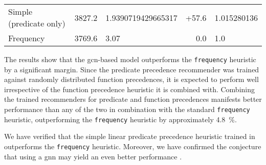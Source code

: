 \begin{table*}[h]
\begin{tabular}{l|ll|rl}
Simple (predicate only) &
\num{3827.2} &
\num[round-mode=places,round-precision=2]{1.9390719429665317} &
+57.6 &
\num[round-mode=places,round-precision=3]{1.015280136} \\




Frequency &
\num{3769.6} &
\num{3.07} &
0.0 &
\num[round-mode=places,round-precision=3]{1.0} \\

\end{tabular}
\end{table*}

The results show that the \gls{gcn}-based model outperforms the \texttt{frequency} heuristic by a significant margin.
Since the predicate precedence recommender was trained against randomly distributed function precedences,
it is expected to perform well irrespective of the function precedence heuristic it is combined with.
Combining the trained recommenders for predicate and function precedences manifests better performance
than any of the two in combination with the standard \texttt{frequency} heuristic,
outperforming the \texttt{frequency} heuristic by approximately \SI{4.8}{\percent}.

We have verified that the simple linear predicate precedence heuristic
trained in \cite{DBLP:conf/cade/Bartek020} outperforms the \texttt{frequency} heuristic.
Moreover, we have confirmed the conjecture that using a \gls{gnn} may yield an even better performance \cite{DBLP:conf/cade/Bartek020}.

